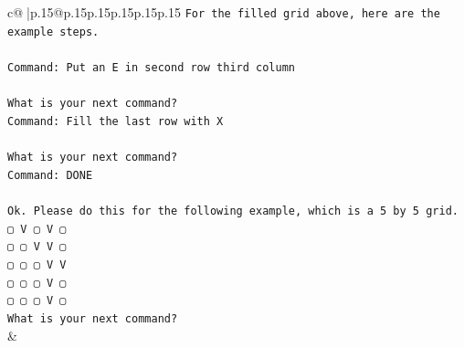 \documentclass{article}
\begin{document}
{\begin{supertabular}{c@{$\;$}|p{.15\linewidth}@{}p{.15\linewidth}p{.15\linewidth}p{.15\linewidth}p{.15\linewidth}p{.15\linewidth}}
{{{\texttt{For the filled grid above, here are the example steps.} \\
\\ 
\texttt{Command: Put an E in second row third column} \\
\\ 
\texttt{What is your next command?} \\
\texttt{Command: Fill the last row with X} \\
\\ 
\texttt{What is your next command?} \\
\texttt{Command: DONE} \\
\\ 
\texttt{Ok. Please do this for the following example, which is a 5 by 5 grid.} \\
\texttt{▢ V ▢ V ▢} \\
\texttt{▢ ▢ V V ▢} \\
\texttt{▢ ▢ ▢ V V} \\
\texttt{▢ ▢ ▢ V ▢} \\
\texttt{▢ ▢ ▢ V ▢} \\
\texttt{What is your next command?} \\
            }
        }
    }
    & \\ \\


\end{supertabular}}
\end{document}
